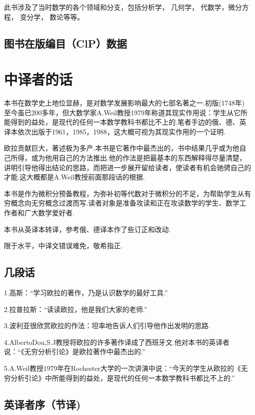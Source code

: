 此书涉及了当时数学的各个领域和分支，包括分析学， 几何学， 代数学，微分方程， 变分学， 数论等等。


\section*{图书在版编目（ClP）数据}



\chapter*{中译者的话}

本书在数学史上地位显赫，是对数学发展影响最大的七部名著之一.初版(1748年)至今虽已200多年，但大数学家A.Weil教授1979年称道其现实作用说：学生从它所能得到的益处，是现代的任何一本数学教科书都比不上的.笔者手边的俄、德、英译本依次出版于1961，1985，1988，这大概可视为其现实作用的一个证明.

欧拉贡献巨大，著述极为多产.本书是它著作中最杰出的，书中结果几乎或为他自己所得，或为他用自己的方法推出.他的作法是把最基本的东西解释得尽量清楚，讲明引导他得出结论的思路，而把进一步展开留给读者，使读者有机会驰骋自己的才能.这大概都是A.Weil教授前面那段话的根据.

本书是作为微积分预备教程，为弥补初等代数对于微积分的不足，为帮助学生从有穷概念向无穷概念过渡而写.读者对象是准备攻读和正在攻读数学的学生、数学工作者和广大数学爱好者.

本书从英译本转译，参考俄、德译本作了些订正和改动.

限于水平，中译文错误难免，敬希指正.

\section*{几段话}

1.高斯：“学习欧拉的著作，乃是认识数学的最好工具.”

2.拉普拉斯：“读读欧拉，他是我们大家的老师.”

3.波利亚很欣赏欧拉的作法：坦率地告诉人们引导他作出发明的思路.

4.AlbertoDou,S.J教授将欧拉的许多著作译成了西班牙文.他对本书的英译者说：“《无穷分析引论》是欧拉著作中最杰出的.”

5.A.Weil教授1979年在Rochester大学的一次讲演中说：“今天的学生从欧拉的《无穷分析引论》中所能得到的益处，是现代的任何一本数学教科书都比不上的.”

\section*{英译者序（节译)}

